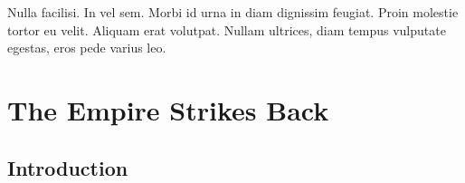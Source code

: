 \graphicspath{{figures/chapter-6/}}


\begin{savequote}[75mm]
Nulla facilisi. In vel sem. Morbi id urna in diam dignissim feugiat. Proin molestie tortor eu velit. Aliquam erat volutpat. Nullam    ultrices, diam tempus vulputate egestas, eros pede varius leo.
\end{savequote}

\chapter{The Empire Strikes Back}


\section{Introduction}

\lipsum[100]
\cite{Lucas5}


